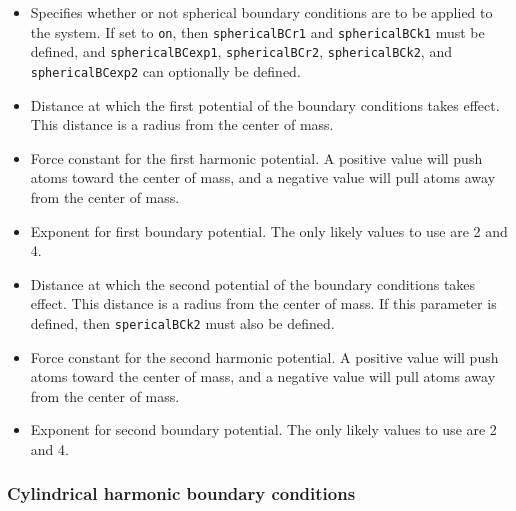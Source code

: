 \begin{itemize}

\item
{}
{Specifies whether or not spherical boundary conditions 
are to be applied to the system.  If 
set to \verb!on!, then \verb!sphericalBCr1! and \verb!sphericalBCk1! 
must be defined, and \verb!sphericalBCexp1!, \verb!sphericalBCr2!, 
\verb!sphericalBCk2!, and \verb!sphericalBCexp2! can optionally be 
defined.}

\item
{}
{Distance at which the first potential of the boundary conditions takes
effect.  This distance is a radius from the center of mass.}

\item
{}
{Force constant for the first harmonic potential.  A positive
value will push atoms toward the center of mass, and a negative
value will pull atoms away from the center of mass.}

\item
{}
{Exponent for first boundary potential.  The only likely values to
use are 2 and 4.}

\item
{}
{Distance at which the second potential of the boundary conditions takes
effect.  This distance is a radius from the center of mass.
If this parameter is defined, then \verb!spericalBCk2! must also
be defined.}

\item
{}
{Force constant for the second harmonic potential.  A positive
value will push atoms toward the center of mass, and a negative
value will pull atoms away from the center of mass.}

\item
{}
{Exponent for second boundary potential.  The only likely values to
use are 2 and 4.}

\end{itemize}

\subsubsection{Cylindrical harmonic boundary conditions}

